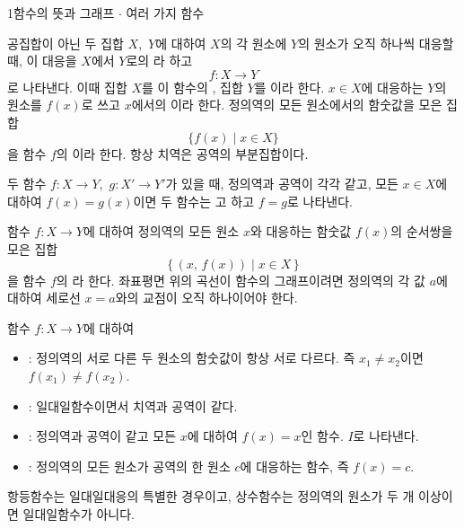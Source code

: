 \documentclass[10pt]{article}
\begin{document}

\begin{dmconcept}{1}{함수의 뜻과 그래프 $\cdot$ 여러 가지 함수}
\setlength{\parskip}{1.4mm plus 1.6mm minus 0mm}\linespread{1.22}\selectfont%


공집합이 아닌 두 집합 $X$,\ $Y$에 대하여 $X$의 각 원소에 $Y$의 원소가 오직 하나씩 대응할 때, 이 대응을 $X$에서 $Y$로의 라 하고
\begin{equation*}
  f : X \to Y
\end{equation*}
로 나타낸다. 이때 집합 $X$를 이 함수의 , 집합 $Y$를 이라 한다. $x \in X$에 대응하는 $Y$의 원소를 $f(x)$로 쓰고 $x$에서의 이라 한다. 정의역의 모든 원소에서의 함숫값을 모은 집합
\begin{equation*}
  \{ f(x) \mid x \in X \}
\end{equation*}
을 함수 $f$의 이라 한다. 항상 치역은 공역의 부분집합이다.


두 함수 $f : X \to Y$,\ $g : X' \to Y'$가 있을 때, 정의역과 공역이 각각 같고, 모든 $x \in X$에 대하여 $f(x) = g(x)$이면 두 함수는 고 하고 $f = g$로 나타낸다.


함수 $f : X \to Y$에 대하여 정의역의 모든 원소 $x$와 대응하는 함숫값 $f(x)$의 순서쌍을 모은 집합
\begin{equation*}
  \{\, (x,\, f(x)) \mid x \in X \,\}
\end{equation*}
을 함수 $f$의 라 한다. 좌표평면 위의 곡선이 함수의 그래프이려면 정의역의 각 값 $a$에 대하여 세로선 $x = a$와의 교점이 오직 하나이어야 한다.


함수 $f : X \to Y$에 대하여
\begin{itemize}[leftmargin=8mm, itemsep=0.5mm, topsep=1mm]
  \item {}: 정의역의 서로 다른 두 원소의 함숫값이 항상 서로 다르다. 즉 $x_1 \ne x_2$이면 $f(x_1) \ne f(x_2)$.
  \item {}: 일대일함수이면서 치역과 공역이 같다.
  \item {}: 정의역과 공역이 같고 모든 $x$에 대하여 $f(x) = x$인 함수. $I$로 나타낸다.
  \item {}: 정의역의 모든 원소가 공역의 한 원소 $c$에 대응하는 함수, 즉 $f(x) = c$.
\end{itemize}
항등함수는 일대일대응의 특별한 경우이고, 상수함수는 정의역의 원소가 두 개 이상이면 일대일함수가 아니다.

\end{dmconcept}
\end{document}
